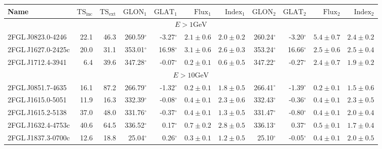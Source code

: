 \documentclass[12pt,preprint]{aastex}
\newcommand{\gev}{\text{GeV}\xspace}
\newcommand{\tsext}{{\ensuremath{\text{TS}_\text{ext}}}\xspace}
\newcommand{\tsinc}{\ensuremath{\text{TS}_\text{inc}}\xspace}
\newcommand{\glon}{\text{GLON}\xspace}
\newcommand{\glat}{\text{GLAT}\xspace}
\renewcommand{\deg}{\ensuremath{^\circ}\xspace}
\begin{document}
\clearpage
\begin{table}
    \begin{centering}
      \begin{tabular}{l|rr|rrrr|rrrr}
        \hline
        \hline
        Name                 &     \tsinc &     \tsext &      $\glon_1$ &      $\glat_1$ &   $\text{Flux}_1$ &   $\text{Index}_1$ &      $\glon_2$ &      $\glat_2$ &   $\text{Flux}_2$ &  $\text{Index}_2$ \\
        \hline
        \multicolumn{11}{c}{$E > 1 \gev$} \\
        \hline
        2FGL\,J0823.0-4246   &       22.1 &       46.3 &     260.59\deg &      -3.27\deg & $       2.1 \pm        0.6$ & $  2.0 \pm   0.2$  &     260.24\deg &      -3.20\deg & $       5.4 \pm        0.7$ & $  2.4 \pm   0.2$ \\
        2FGL\,J1627.0-2425c  &       20.0 &       31.1 &     353.01\deg &      16.98\deg & $       3.1 \pm        0.6$ & $  2.6 \pm   0.3$  &     353.24\deg &      16.66\deg & $       2.5 \pm        0.6$ & $  2.5 \pm   0.4$ \\
        2FGL\,J1712.4-3941   &        6.4 &       39.6 &     347.28\deg &      -0.07\deg & $       0.2 \pm        0.1$ & $  0.6 \pm   0.5$  &     347.22\deg &      -0.27\deg & $       2.4 \pm        0.7$ & $  1.9 \pm   0.2$ \\
        \hline
        \multicolumn{11}{c}{$E > 10 \gev$} \\
        \hline
        2FGL\,J0851.7-4635   &       16.1 &       87.2 &     266.79\deg &      -1.32\deg & $       0.2 \pm        0.1$ & $  1.8 \pm   0.5$  &     266.41\deg &      -1.39\deg & $       0.2 \pm        0.1$ & $  1.5 \pm   0.6$ \\
        2FGL\,J1615.0-5051   &       11.9 &       16.3 &     332.39\deg &      -0.08\deg & $       0.4 \pm        0.1$ & $  2.3 \pm   0.6$  &     332.43\deg &      -0.36\deg & $       0.4 \pm        0.1$ & $  2.3 \pm   0.5$ \\
        2FGL\,J1615.2-5138   &       37.0 &       48.0 &     331.76\deg &      -0.37\deg & $       0.4 \pm        0.1$ & $  1.3 \pm   0.5$  &     331.47\deg &      -0.80\deg & $       0.4 \pm        0.1$ & $  2.0 \pm   0.4$ \\
        2FGL\,J1632.4-4753c  &       40.6 &       64.5 &     336.52\deg &       0.17\deg & $       0.7 \pm        0.2$ & $  2.8 \pm   0.5$  &     336.13\deg &       0.37\deg & $       0.5 \pm        0.1$ & $  1.7 \pm   0.4$ \\
        2FGL\,J1837.3-0700c  &       12.6 &       18.8 &      25.04\deg &       0.26\deg & $       0.3 \pm        0.1$ & $  1.2 \pm   0.5$  &      25.10\deg &      -0.05\deg & $       0.4 \pm        0.1$ & $  2.0 \pm   0.5$ \\

\end{tabular}
\end{centering}
\end{table}
\end{document}
